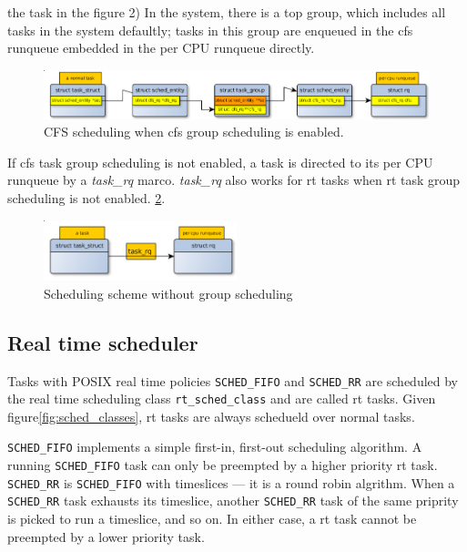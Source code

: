 the task in the figure 2) In the system, there is a top group, which includes
all tasks in the system defaultly; tasks in this group are enqueued in the
cfs runqueue embedded in the per CPU runqueue directly.
\begin{figure}[htbp]
        \centering
        \includegraphics[width=\textwidth]{images/cfs_scheduling_scheme_tg}
        \caption{CFS scheduling when cfs group scheduling is enabled.}
        \label{fig:cfs_scheme_tg}
\end{figure}

If cfs task group scheduling is not enabled, a task is directed to its 
per CPU runqueue by a \emph{task\_rq} marco. \emph{task\_rq} also works 
for rt tasks when rt task group scheduling is not enabled.
\ref{fig:sched_scheme_no_tg}.
\begin{figure}[htbp]
        \centering
        \includegraphics[height=0.1\textheight,width=0.5\textwidth]{images/scheduling_scheme_no_tg}
        \caption{Scheduling scheme without group scheduling}
        \label{fig:sched_scheme_no_tg}
\end{figure}

\subsection{Real time scheduler\label{LinuxSched_rt}}
Tasks with POSIX real time policies \texttt{SCHED\_FIFO} and \texttt{SCHED\_RR}
are scheduled by the real time scheduling class \texttt{rt\_sched\_class} and
are called rt tasks. Given figure\ref{fig:sched_classes}, rt tasks are always
schedueld over normal tasks. 

\texttt{SCHED\_FIFO} implements a simple first-in, first-out scheduling 
algorithm. A running \texttt{SCHED\_FIFO} task can only be preempted by a 
higher priority rt task. \texttt{SCHED\_RR} is \texttt{SCHED\_FIFO} with 
timeslices --- it is a round robin algrithm. When a \texttt{SCHED\_RR}
task exhausts its timeslice, another \texttt{SCHED\_RR} task of the same
priprity is picked to run a timeslice, and so on. In either case, a rt task
cannot be preempted by a lower priority task.

